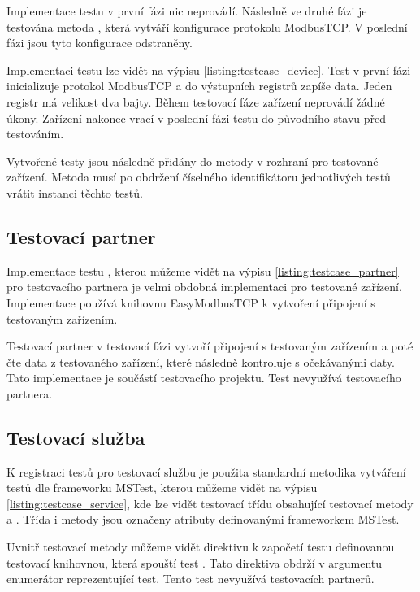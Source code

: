 Implementace testu  v první fázi nic neprovádí. Následně ve druhé fázi je testována metoda , která vytváří konfigurace protokolu ModbusTCP. V poslední fázi jsou tyto konfigurace odstraněny.  

Implementaci testu  lze vidět na výpisu \ref{listing:testcase_device}. Test v první fázi inicializuje protokol ModbusTCP a do výstupních registrů zapíše data. Jeden registr má velikost dva bajty. Během testovací fáze zařízení neprovádí žádné úkony. Zařízení nakonec vrací v poslední fázi testu do původního stavu před testováním.

Vytvořené testy jsou následně přidány do metody  v rozhraní pro testované zařízení. Metoda  musí po obdržení číselného identifikátoru jednotlivých testů vrátit instanci těchto testů.


\subsection{Testovací partner}
Implementace testu , kterou můžeme vidět na výpisu \ref{listing:testcase_partner} pro testovacího partnera je velmi obdobná implementaci pro testované zařízení. Implementace používá knihovnu EasyModbusTCP k vytvoření připojení s testovaným zařízením. 

Testovací partner v testovací fázi vytvoří připojení s testovaným zařízením a poté čte data z testovaného zařízení, které následně kontroluje s očekávanými daty. Tato implementace je součástí testovacího projektu. Test  nevyužívá testovacího partnera.


\subsection{Testovací služba}

K registraci testů pro testovací službu je použita standardní metodika vytváření testů dle frameworku MSTest, kterou můžeme vidět na výpisu \ref{listing:testcase_service}, kde lze vidět testovací třídu  obsahující testovací metody  a . Třída i metody jsou označeny atributy definovanými frameworkem MSTest. 

Uvnitř testovací metody  můžeme vidět direktivu k započetí testu definovanou testovací knihovnou, která spouští test . Tato direktiva obdrží v argumentu enumerátor reprezentující test. Tento test nevyužívá testovacích partnerů. 

